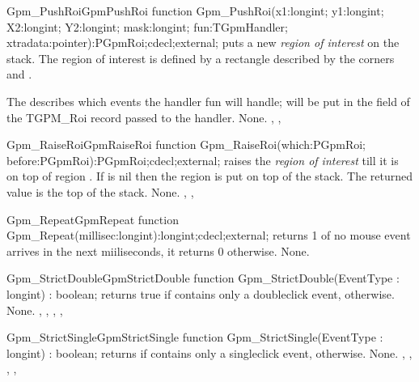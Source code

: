\begin{functionl}{Gpm\_PushRoi}{GpmPushRoi}
\Declaration
function Gpm\_PushRoi(x1:longint; y1:longint; X2:longint; Y2:longint; mask:longint; fun:TGpmHandler; xtradata:pointer):PGpmRoi;cdecl;external;
\Description
{} puts a new {\em region of interest} on the stack.
The region of interest is defined by a rectangle described by the corners
 and . 

The  describes which events the handler {fun} will handle;
 will be put in the  field of the {TGPM\_Roi} 
record passed to the  handler.
\Errors
None.
\SeeAlso
{},
, 
\end{functionl}

\begin{functionl}{Gpm\_RaiseRoi}{GpmRaiseRoi}
\Declaration
function Gpm\_RaiseRoi(which:PGpmRoi; before:PGpmRoi):PGpmRoi;cdecl;external;
\Description
{} raises the {\em region of interest}  till it
is on top of region . If  is nil then the region is
put on top of the stack. The returned value is the top of the stack.
\Errors
None.
\SeeAlso
{},
, 
\end{functionl}

\begin{functionl}{Gpm_Repeat}{GpmRepeat}
\Declaration
function Gpm\_Repeat(millisec:longint):longint;cdecl;external;
\Description
{} returns 1 of no mouse event arrives in the next
 miiliseconds, it returns 0 otherwise.
\Errors
None.
\SeeAlso
{}
\end{functionl}

\begin{functionl}{Gpm\_StrictDouble}{GpmStrictDouble}
\Declaration
function Gpm\_StrictDouble(EventType : longint) : boolean;
\Description
{} returns true if  contains only a 
doubleclick event,  otherwise.
\Errors
None.
\SeeAlso
{},
,
,
,
\end{functionl}

\begin{functionl}{Gpm\_StrictSingle}{GpmStrictSingle}
\Declaration
function Gpm\_StrictSingle(EventType : longint) : boolean;
\Description
{} returns  if  contains only a 
singleclick event,  otherwise. 
\Errors
None.
\SeeAlso
{},
,
, 
,
\end{functionl}

